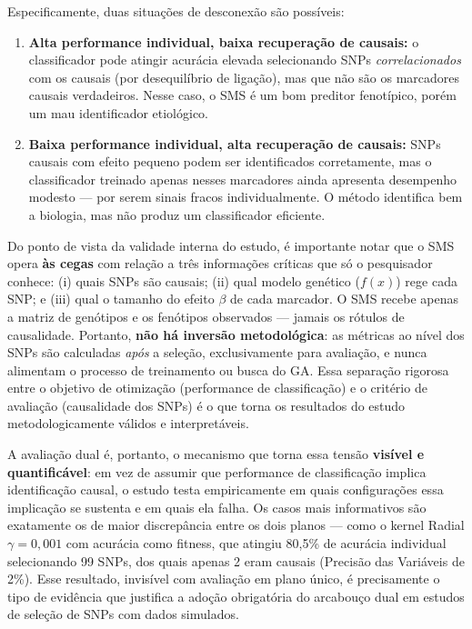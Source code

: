 \documentclass[
    12pt,
    a4paper,
    oneside,
    english,
    french,
    spanish,
    brazil
    ]{abntex2}
\newcommand{\novo}[1]{\textcolor{corNova}{#1}}
\begin{document}
\novo{Especificamente, duas situações de desconexão são possíveis:}
\begin{enumerate}
  \item \novo{\textbf{Alta performance individual, baixa recuperação de causais:} o classificador pode atingir acurácia elevada selecionando SNPs \emph{correlacionados} com os causais (por desequilíbrio de ligação), mas que não são os marcadores causais verdadeiros. Nesse caso, o SMS é um bom preditor fenotípico, porém um mau identificador etiológico.}
  \item \novo{\textbf{Baixa performance individual, alta recuperação de causais:} SNPs causais com efeito pequeno podem ser identificados corretamente, mas o classificador treinado apenas nesses marcadores ainda apresenta desempenho modesto --- por serem sinais fracos individualmente. O método identifica bem a biologia, mas não produz um classificador eficiente.}
\end{enumerate}

\novo{Do ponto de vista da validade interna do estudo, é importante notar que o SMS opera \textbf{às cegas} com relação a três informações críticas que só o pesquisador conhece: (i) quais SNPs são causais; (ii) qual modelo genético ($f(x)$) rege cada SNP; e (iii) qual o tamanho do efeito $\beta$ de cada marcador. O SMS recebe apenas a matriz de genótipos e os fenótipos observados --- jamais os rótulos de causalidade. Portanto, \textbf{não há inversão metodológica}: as métricas ao nível dos SNPs são calculadas \emph{após} a seleção, exclusivamente para avaliação, e nunca alimentam o processo de treinamento ou busca do GA. Essa separação rigorosa entre o objetivo de otimização (performance de classificação) e o critério de avaliação (causalidade dos SNPs) é o que torna os resultados do estudo metodologicamente válidos e interpretáveis.}

\novo{A avaliação dual é, portanto, o mecanismo que torna essa tensão \textbf{visível e quantificável}: em vez de assumir que performance de classificação implica identificação causal, o estudo testa empiricamente em quais configurações essa implicação se sustenta e em quais ela falha. Os casos mais informativos são exatamente os de maior discrepância entre os dois planos --- como o kernel Radial $\gamma = 0{,}001$ com acurácia como fitness, que atingiu 80{,}5\% de acurácia individual selecionando 99 SNPs, dos quais apenas 2 eram causais (Precisão das Variáveis de 2\%). Esse resultado, invisível com avaliação em plano único, é precisamente o tipo de evidência que justifica a adoção obrigatória do arcabouço dual em estudos de seleção de SNPs com dados simulados.}
\end{document}

